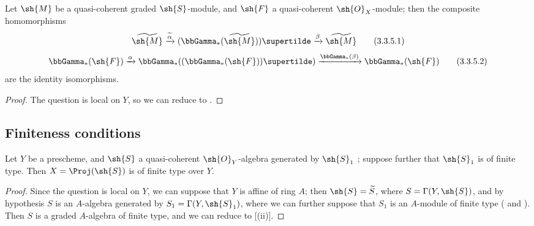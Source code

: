 \begin{proposition}[3.3.5]
\label{II.3.3.5}
Let $\sh{M}$ be a quasi-coherent graded $\sh{S}$-module, and $\sh{F}$ a quasi-coherent $\sh{O}_X$-module;
then the composite homomorphisms
\[
\label{II.3.3.5.1}
  \widetilde{\sh{M}} \xrightarrow{\widetilde{\alpha}} (\bbGamma_*(\widetilde{\sh{M}}))\supertilde \xrightarrow{\beta} \widetilde{\sh{M}}
\tag{3.3.5.1}
\]
\[
\label{II.3.3.5.2}
  \bbGamma_*(\sh{F}) \xrightarrow{\alpha} \bbGamma_*((\bbGamma_*(\sh{F}))\supertilde) \xrightarrow{\bbGamma_*(\beta)} \bbGamma_*(\sh{F})
\tag{3.3.5.2}
\]
are the identity isomorphisms.
\end{proposition}

\begin{proof}
The question is local on $Y$, so we can reduce to .
\end{proof}


\subsection{Finiteness conditions}
\label{subsection:II.3.4}

\begin{proposition}[3.4.1]
\label{II.3.4.1}
Let $Y$ be a prescheme, and $\sh{S}$ a quasi-coherent $\sh{O}_Y$-algebra generated by $\sh{S}_1$ ;
suppose further that $\sh{S}_1$ is of finite type.
Then $X=\Proj(\sh{S})$ is of finite type over $Y$.
\end{proposition}

\begin{proof}
Since the question is local on $Y$, we can suppose that $Y$ is affine of ring $A$;
then $\sh{S}=\widetilde{S}$, where $S=\Gamma(Y,\sh{S})$, and by hypothesis $S$ is an $A$-algebra generated by $S_1=\Gamma(Y,\sh{S}_1)$, where we can further suppose that $S_1$ is an $A$-module of finite type ( and ).
Then $S$ is a graded $A$-algebra of finite type, and we can reduce to [(ii)].
\end{proof}

